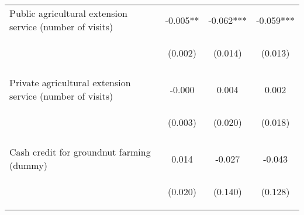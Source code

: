 \begin{center}
\begin{tabular}{lccc}
Public agricultural extension service (number of visits) & -0.005** & -0.062*** & -0.059*** \\
 & \begin{footnotesize}(0.002)\end{footnotesize} & \begin{footnotesize}(0.014)\end{footnotesize} & \begin{footnotesize}(0.013)\end{footnotesize} \\
\vspace{4pt} & \begin{footnotesize}[0.011]\end{footnotesize} & \begin{footnotesize}[0.000]\end{footnotesize} & \begin{footnotesize}[0.000]\end{footnotesize} \\
Private agricultural extension service (number of visits) & -0.000 & 0.004 & 0.002 \\
 & \begin{footnotesize}(0.003)\end{footnotesize} & \begin{footnotesize}(0.020)\end{footnotesize} & \begin{footnotesize}(0.018)\end{footnotesize} \\
\vspace{4pt} & \begin{footnotesize}[0.975]\end{footnotesize} & \begin{footnotesize}[0.861]\end{footnotesize} & \begin{footnotesize}[0.905]\end{footnotesize} \\
Cash credit for groundnut farming (dummy) & 0.014 & -0.027 & -0.043 \\
 & \begin{footnotesize}(0.020)\end{footnotesize} & \begin{footnotesize}(0.140)\end{footnotesize} & \begin{footnotesize}(0.128)\end{footnotesize} \\

\end{tabular}
\end{center}
